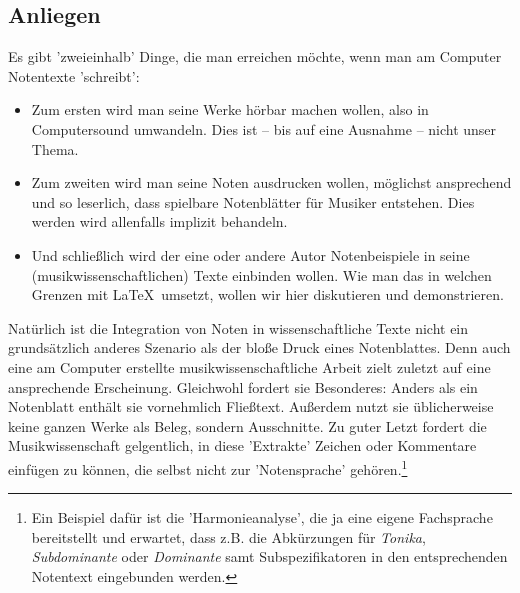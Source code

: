 %
%
%



\subsection{Anliegen}

Es gibt 'zweieinhalb' Dinge, die man erreichen möchte, wenn man am Computer
Notentexte 'schreibt':

\begin{itemize}
  \item Zum ersten wird man seine Werke hörbar machen wollen, also in
  Computersound umwandeln. Dies ist -- bis auf eine Ausnahme -- nicht
  unser Thema.
  \item Zum zweiten wird man seine Noten ausdrucken wollen, möglichst
  ansprechend und so leserlich, dass spielbare Notenblätter für Musiker
  entstehen. Dies werden wird allenfalls implizit behandeln.
  \item Und schließlich wird der eine oder andere Autor Notenbeispiele in seine
  (musikwissenschaftlichen) Texte einbinden wollen. Wie man das in welchen
  Grenzen mit \LaTeX\ umsetzt, wollen wir hier diskutieren und demonstrieren.
\end{itemize}

Natürlich ist die Integration von Noten in wissenschaftliche Texte nicht ein
grundsätzlich anderes Szenario als der bloße Druck eines Notenblattes.
Denn auch eine am Computer erstellte musikwissenschaftliche Arbeit zielt zuletzt
auf eine ansprechende Erscheinung. Gleichwohl fordert sie Besonderes: Anders als
ein Notenblatt enthält sie vornehmlich Fließtext. Außerdem nutzt sie
üblicherweise keine ganzen Werke als Beleg, sondern Ausschnitte. Zu guter Letzt
fordert die Musikwissenschaft gelgentlich, in diese 'Extrakte' Zeichen oder
Kommentare einfügen zu können, die selbst nicht zur 'Notensprache'
gehören.\footnote{Ein Beispiel dafür ist die 'Harmonieanalyse', die ja eine
eigene Fachsprache bereitstellt und erwartet, dass z.B. die Abkürzungen für
\textit{Tonika}, \textit{Subdominante} oder \textit{Dominante} samt
Subspezifikatoren in den entsprechenden Notentext eingebunden werden.}

